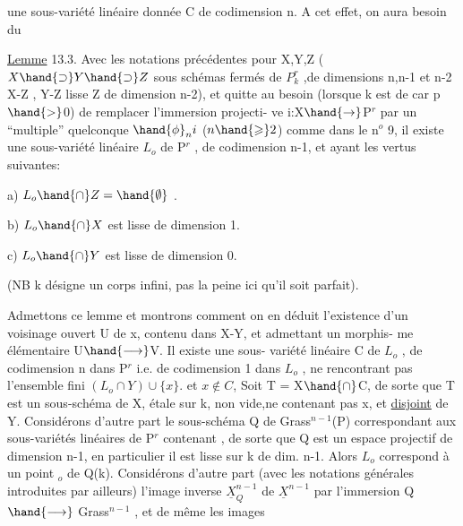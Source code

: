 
une sous-variété linéaire donnée C  de codimension n.  A cet effet,
on aura besoin du

\uline{Lemme} 13.3.  Avec les notations précédentes pour  X,Y,Z  ($X\hand{\supset} Y\hand{\supset} Z$
sous schémas fermés de $P^r_k$ ,de dimensions n,n-1 et \hand{$\leqslant$} n-2 X-Z\hand{,} ,
Y-Z lisse \hand{,} Z de dimension \hand{$\leqslant$}n-2), et quitte
au besoin (lorsque k est de car p$\hand{>}$0)  de remplacer l'immersion projecti-%
ve  i:X$\hand{\rightarrow}$P$^r$  par  un ``multiple'' quelconque $\hand{\phi}_n i$ ($n \hand{\geqslant} 2$)  comme dans le
n$^o$ 9,  il existe une sous-variété linéaire  $L_o$ de P$^r$ , de codimension
n-1, et ayant les vertus suivantes:

a)  $L_o \hand{\cap} Z = \hand{\emptyset}$ .

b)  $L_o \hand{\cap} X$  est lisse de dimension 1.

c)  $L_o \hand{\cap} Y$   est lisse de dimension  0.

(NB  k désigne un corps infini, pas la peine ici qu'il soit parfait).

Admettons  ce lemme  et montrons comment on en déduit  l'existence
d'un voisinage ouvert U de x, contenu dans X-Y, et admettant un morphis-%
me élémentaire U$\hand{\longrightarrow}$V.  
 Il existe une sous-%
variété linéaire C de $L_o$ , de codimension n dans P$^r$ i.e. de codimension
1 dans $L_o$ , ne rencontrant pas l'ensemble fini  $(L_o\cap Y)\cup\{x\}$. 
  et $x\notin C$, 
 Soit  T = X$\hand{\cap}$C, de sorte que T est un sous-schéma de X,
étale sur k, non vide,ne contenant pas x, et \uline{disjoint} de Y.  Considérons d'autre part le
sous-schéma Q de Grass$^{n-1}$(P) correspondant aux sous-variétés linéaires
de P$^r$ contenant , de sorte que  Q est un  espace projectif
de dimension n-1,   en particulier il est lisse sur k de dim. n-1.
Alors $L_o$ correspond à un point \hand{$\xi$}$_o$ de Q(k).  Considérons d'autre part
(avec les notations générales introduites par ailleurs)  l'image inverse
$\underline{X}^{n-1}_Q$ de $\underline{X}^{n-1}$  par  l'immersion Q$\hand{\longrightarrow}$ Grass$^{n-1}$ , et de même les images

